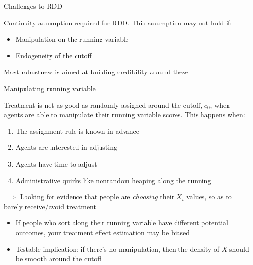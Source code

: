 \documentclass[compress, 8pt]{beamer}
\begin{document}
\begin{frame}{Challenges to RDD}

Continuity assumption required for RDD. This assumption may not hold if:
\begin{itemize}
    \item Manipulation on the running variable
    \item Endogeneity of the cutoff
\end{itemize}
Most robustness is aimed at building credibility around these

\end{frame}


\begin{frame}{Manipulating running variable}

Treatment is not as good as randomly assigned around the cutoff, $c_0$, when agents are able to manipulate their running variable scores. This happens when:
\begin{enumerate}
      \item The assignment rule is known in advance
      \item Agents are interested in adjusting
      \item Agents have time to adjust
      \item Administrative quirks like nonrandom heaping along the running
  \end{enumerate}  

\vspace{3ex}
$\implies$ Looking for evidence that people are \emph{choosing} their $X_i$ values, so as to barely receive/avoid treatment
\begin{itemize}
    \item If people who sort along their running variable have different potential outcomes, your treatment effect estimation may be biased
    \item Testable implication: if there's no manipulation, then the density of $X$ should be smooth around the cutoff
\end{itemize}

\end{frame}
\end{document}

